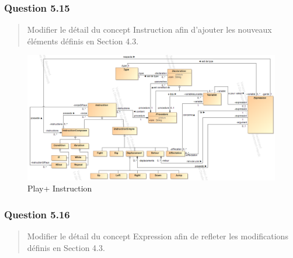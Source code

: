 \documentclass[]{article}
\begin{document}
\hypertarget{question-5.15}{%
\subsubsection{Question 5.15}\label{question-5.15}}

\begin{quote}
Modifier le détail du concept Instruction afin d'ajouter les nouveaux
éléments définis en Section 4.3.
\end{quote}

\begin{figure}[ht]
\includegraphics{./images_final/Play+Q15.png}
\caption{Play+ Instruction}
\end{figure}

\hypertarget{question-5.16}{%
\subsubsection{Question 5.16}\label{question-5.16}}

\begin{quote}
Modifier le détail du concept Expression afin de refleter les
modifications définis en Section 4.3.
\end{quote}
\end{document}
